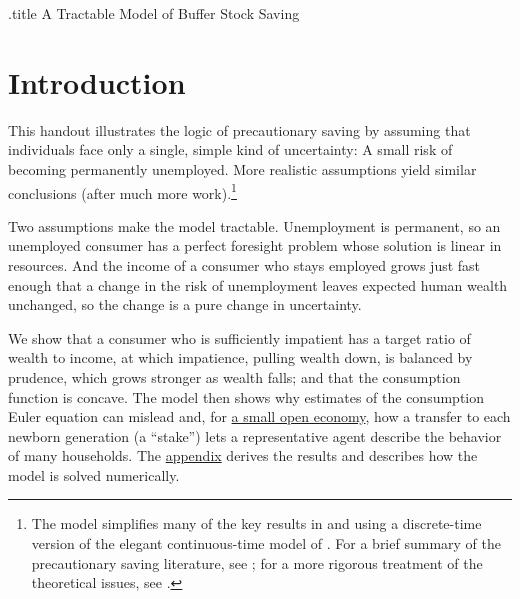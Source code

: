 \documentclass{econark}
\begin{document}




\handoutHeader

\begin{verbatimwrite}{\jobname.title}
A Tractable Model of Buffer Stock Saving
\end{verbatimwrite}

\handoutNameMake

\section{Introduction} 
This handout illustrates the logic of precautionary saving by assuming that individuals face only a single, simple kind of uncertainty: A small risk of becoming permanently unemployed.  More realistic assumptions yield similar conclusions (after much more work).\footnote{The model simplifies many of the key results in \cite{carroll:brookings} and \cite{BufferStockTheory} using a discrete-time version of the elegant continuous-time model of \cite{toche:urisk}.  For a brief summary of the precautionary saving literature, see \cite{CarrollKimballPSPW}; for a more rigorous treatment of the theoretical issues, see \cite{BufferStockTheory}.}


Two assumptions make the model tractable. Unemployment is permanent, so an unemployed consumer has a perfect foresight problem whose solution is linear in resources. And the income of a consumer who stays employed grows just fast enough that a change in the risk of unemployment leaves expected human wealth unchanged, so the change is a pure change in uncertainty.

We show that a consumer who is sufficiently impatient has a target ratio of wealth to income, at which impatience, pulling wealth down, is balanced by prudence, which grows stronger as wealth falls; and that the consumption function is concave. The model then shows why estimates of the consumption Euler equation can mislead and, for \href{\MacroPDF}{a small open economy}, how a transfer to each newborn generation (a ``stake'') lets a representative agent describe the behavior of many households. The \href{\AppendixPDF}{appendix} derives the results and describes how the model is solved numerically.
\end{document}
